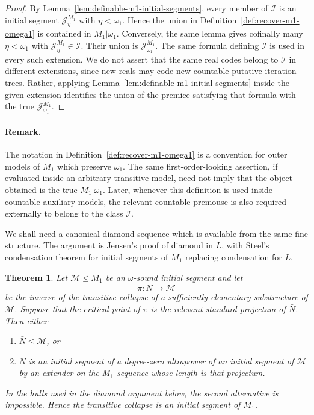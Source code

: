 \documentclass[a4paper,11pt]{article}
\newtheorem{theorem}{Theorem}[section]
\begin{document}
\begin{proof}
By Lemma~\ref{lem:definable-m1-initial-segments}, every member of $\mathcal I$ is an initial segment $\mathcal J^{M_1}_\eta$ with $\eta<\omega_1$.  Hence the union in Definition~\ref{def:recover-m1-omega1} is contained in $M_1|\omega_1$.  Conversely, the same lemma gives cofinally many $\eta<\omega_1$ with $\mathcal J_\eta^{M_1}\in\mathcal I$.  Their union is $\mathcal J^{M_1}_{\omega_1}$.  The same formula defining $\mathcal I$ is used in every such extension.  We do not assert that the same real codes belong to $\mathcal I$ in different extensions, since new reals may code new countable putative iteration trees.  Rather, applying Lemma~\ref{lem:definable-m1-initial-segments} inside the given extension identifies the union of the premice satisfying that formula with the true $\mathcal J^{M_1}_{\omega_1}$.
\end{proof}

\paragraph{Remark.}\label{rem:m1-omega1-not-absolute}
The notation in Definition~\ref{def:recover-m1-omega1} is a convention for outer models of $M_1$ which preserve $\omega_1$.  The same first-order-looking assertion, if evaluated inside an arbitrary transitive model, need not imply that the object obtained is the true $M_1|\omega_1$.  Later, whenever this definition is used inside countable auxiliary models, the relevant countable premouse is also required externally to belong to the class $\mathcal I$.


We shall need a canonical diamond sequence which is available from the same fine structure.  The argument is Jensen's proof of diamond in $L$, with Steel's condensation theorem for initial segments of $M_1$ replacing condensation for $L$.

\begin{theorem}\label{thm:steel-condensation-m1}
Let $\mathcal M\trianglelefteq M_1$ be an $\omega$-sound initial segment and let
\[
   \pi:\bar N\rightarrow\mathcal M
\]
be the inverse of the transitive collapse of a sufficiently elementary substructure of $\mathcal M$.  Suppose that the critical point of $\pi$ is the relevant standard projectum of $\bar N$.  Then either
\begin{enumerate}
   \item $\bar N\trianglelefteq\mathcal M$, or
   \item $\bar N$ is an initial segment of a degree-zero ultrapower of an initial segment of $\mathcal M$ by an extender on the $M_1$-sequence whose length is that projectum.
\end{enumerate}
In the hulls used in the diamond argument below, the second alternative is impossible.  Hence the transitive collapse is an initial segment of $M_1$.
\end{theorem}
\end{document}
